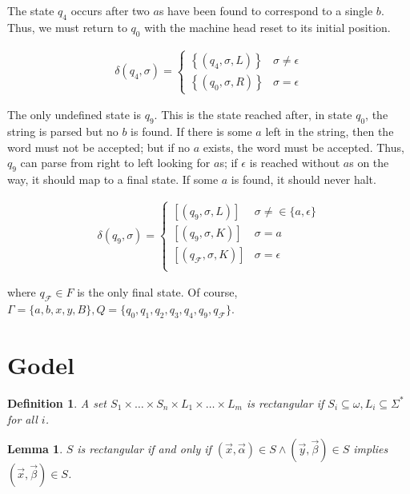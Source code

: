 \documentclass[a4paper, 12pt]{article}
\newtheorem{lemma}{Lemma}
\newtheorem{definition}{Definition}
\newtheorem{lemma}{Lemma}
\begin{document}
The state $q_4$ occurs after two $a$s have been found to correspond to a single
$b$. Thus, we must return to $q_0$ with the machine head reset to its initial
position. 

\begin{align*}
    \delta(q_4, \sigma) = \begin{cases}
        \left\{ \left( q_4, \sigma, L \right)  \right\} & \sigma \neq \epsilon
        \\
        \left\{ \left( q_0, \sigma, R \right)  \right\} & \sigma = \epsilon 
    \end{cases}
\end{align*}

The only undefined state is $q_9$. This is the state reached after, in state
$q_0$, the string is parsed but no $b$ is found. If there is some $a$ left in
the string, then the word must not be accepted; but if no $a$ exists, the word
must be accepted. Thus, $q_9$ can parse from right to left looking for $a$s; if
$\epsilon$ is reached without $a$s on the way, it should map to a final state.
If some $a$ is found, it should never halt.

\begin{align*}
    \delta(q_9, \sigma) = \begin{cases}
        \left[ \left( q_9, \sigma, L \right)   \right] & \sigma \neq\in \{a,
        \epsilon\} \\
        \left[ \left( q_9, \sigma, K \right)   \right] & \sigma = a \\ 
        \left[ \left( q_\mathcal{F}, \sigma, K \right)   \right] & \sigma = \epsilon \\ 
    \end{cases}
\end{align*}

where $q_{\mathcal{F}} \in F$ is the only final state. Of course, $\Gamma = \{a,
b, x, y, B\}, Q = \{ q_0, q_1, q_2, q_3, q_4, q_9, q_{\mathcal{F}}\}$.

\pagebreak
\section{Godel}

\begin{definition}
    A set $S_1\times  \ldots  \times  S_n \times L_1 \times  \ldots \times  L_m$ is
    rectangular if $S_i \subseteq \omega, L_i \subseteq \Sigma^{*}$ for all $i$.
\end{definition}

\begin{lemma}
    $S$ is rectangular if and only if $(\overrightarrow{x},
    \overrightarrow{\alpha}) \in S \land (\overrightarrow{y},
    \overrightarrow{\beta}) \in S$ implies $(\overrightarrow{x},
    \overrightarrow{\beta}) \in S$.
\end{lemma}
\end{document}
